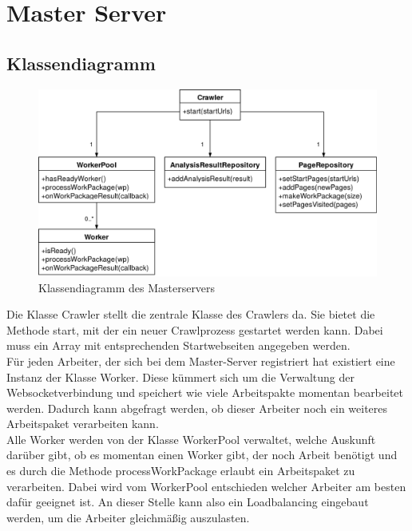 \section{Master Server}
\subsection{Klassendiagramm}

\begin{figure}
	\centering
	\hspace*{-1cm}
	\includegraphics[width=1\textwidth]{Bilder/CrawlerKlassendiagramm.png}
	\caption{Klassendiagramm des Masterservers}
\end{figure}

Die Klasse Crawler stellt die zentrale Klasse des Crawlers da. Sie bietet die Methode start, mit der ein neuer Crawlprozess gestartet werden kann. Dabei muss ein Array mit entsprechenden Startwebseiten angegeben werden. \\
Für jeden Arbeiter, der sich bei dem Master-Server registriert hat existiert eine Instanz der Klasse Worker. Diese kümmert sich um die Verwaltung der Websocketverbindung und speichert wie viele Arbeitspakte momentan bearbeitet werden. Dadurch kann abgefragt werden, ob dieser Arbeiter noch ein weiteres Arbeitspaket verarbeiten kann. \\
Alle Worker werden von der Klasse WorkerPool verwaltet, welche Auskunft darüber gibt, ob es momentan einen Worker gibt, der noch Arbeit benötigt und es durch die Methode processWorkPackage erlaubt ein Arbeitspaket zu verarbeiten. Dabei wird vom WorkerPool entschieden welcher Arbeiter am besten dafür geeignet ist. An dieser Stelle kann also ein Loadbalancing eingebaut werden, um die Arbeiter gleichmäßig auszulasten.

